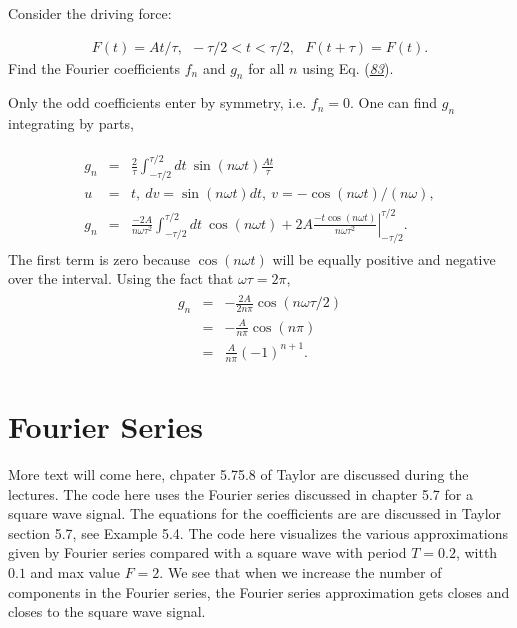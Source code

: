 \documentclass[letterpaper,10pt,english]{sphinxmanual}
\begin{document}
Consider the driving force:




\begin{equation*}
\begin{split}
\begin{equation}
F(t)=At/\tau,~~-\tau/2<t<\tau/2,~~~F(t+\tau)=F(t).
\label{_auto64} \tag{85}
\end{equation}
\end{split}
\end{equation*}
Find the Fourier coefficients \(f_n\) and \(g_n\) for all \(n\) using Eq. ({\hyperref[\detokenize{chapter1:eq:fourierdef2}]{\emph{83}}}).

Only the odd coefficients enter by symmetry, i.e. \(f_n=0\). One can find \(g_n\) integrating by parts,




\begin{equation*}
\begin{split}
\begin{eqnarray}
\label{eq:fouriersolution} \tag{86}
g_n&=&\frac{2}{\tau}\int_{-\tau/2}^{\tau/2}dt~\sin(n\omega t) \frac{At}{\tau}\\
\nonumber
u&=&t,~dv=\sin(n\omega t)dt,~v=-\cos(n\omega t)/(n\omega),\\
\nonumber
g_n&=&\frac{-2A}{n\omega \tau^2}\int_{-\tau/2}^{\tau/2}dt~\cos(n\omega t)
+\left.2A\frac{-t\cos(n\omega t)}{n\omega\tau^2}\right|_{-\tau/2}^{\tau/2}.
\end{eqnarray}
\end{split}
\end{equation*}
The first term is zero because \(\cos(n\omega t)\) will be equally
positive and negative over the interval. Using the fact that
\(\omega\tau=2\pi\),
\begin{equation*}
\begin{split}
\begin{eqnarray}
g_n&=&-\frac{2A}{2n\pi}\cos(n\omega\tau/2)\\
\nonumber
&=&-\frac{A}{n\pi}\cos(n\pi)\\
\nonumber
&=&\frac{A}{n\pi}(-1)^{n+1}.
\end{eqnarray}
\end{split}
\end{equation*}

\section{Fourier Series}
\label{\detokenize{chapter1:fourier-series}}
More text will come here, chpater 5.7\sphinxhyphen{}5.8 of Taylor are discussed
during the lectures. The code here uses the Fourier series discussed
in chapter 5.7 for a square wave signal. The equations for the
coefficients are are discussed in Taylor section 5.7, see Example
5.4. The code here visualizes the various approximations given by
Fourier series compared with a square wave with period \(T=0.2\), witth
\(0.1\) and max value \(F=2\). We see that when we increase the number of
components in the Fourier series, the Fourier series approximation gets closes and closes to the square wave signal.
\end{document}
